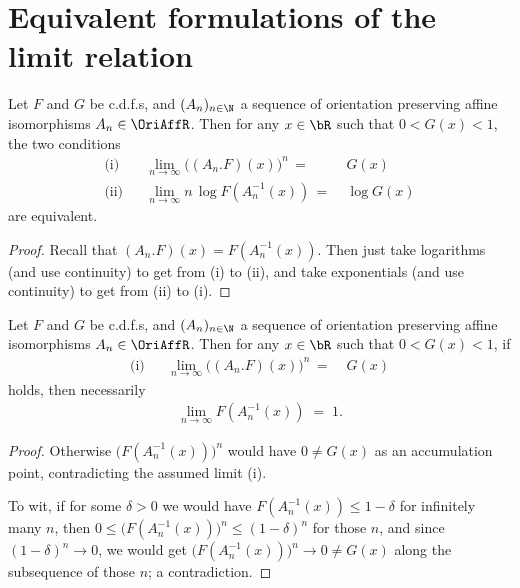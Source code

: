 \section{Equivalent formulations of the limit relation}

\begin{lemma}
  \label{lem:log-ev-limit}
  \leanok
  Let $F$ and $G$ be c.d.f.s, and $(A_n)_{n \in \N}$ a sequence of orientation
  preserving affine isomorphisms $A_n \in \OriAffR$. Then for any $x \in \bR$
  such that $0 < G(x) < 1$, the two conditions
  \begin{align*}
  \text{(i)} & & \lim_{n \to \infty} \big( (A_n.F)(x) \big)^n \, = \; & G(x) \\
  \text{(ii)} & & \lim_{n \to \infty} n \, \log F (A_n^{-1}(x)) \, = \; & \log G(x)
  \end{align*}
  are equivalent.
\end{lemma}
\begin{proof}
  \uses{}
  \leanok
  Recall that $(A_n.F)(x) = F (A_n^{-1}(x))$.
  Then just take logarithms (and use continuity) to get from (i) to (ii),
  and take exponentials (and use continuity) to get from (ii) to (i).
\end{proof}

\begin{lemma}
  \label{lem:ev-limit-cdf-affine-tendsto-one}
  \leanok
  Let $F$ and $G$ be c.d.f.s, and $(A_n)_{n \in \N}$ a sequence of orientation
  preserving affine isomorphisms $A_n \in \OriAffR$. Then for any $x \in \bR$
  such that $0 < G(x) < 1$, if
  \begin{align*}
  \text{(i)} & & \lim_{n \to \infty} \big( (A_n.F)(x) \big)^n \, = \; & G(x)
  \end{align*}
  holds, then necessarily
  \begin{align*}
    \lim_{n \to \infty} F (A_n^{-1}(x)) \; = \; 1 .
  \end{align*}
\end{lemma}
\begin{proof}
  Otherwise $\big( F (A_n^{-1}(x)) \big)^n$ would have $0 \ne G(x)$
  as an accumulation point, contradicting the assumed limit (i).

  To wit, if for some $\delta > 0$ we would have
  $F (A_n^{-1}(x)) \le 1 - \delta$ for infinitely many $n$, then
  $0 \le \big( F (A_n^{-1}(x)) \big)^n \le (1 - \delta)^n $
  for those $n$, and since $(1 - \delta)^n \to 0$, we would
  get $\big( F (A_n^{-1}(x)) \big)^n \to 0 \ne G(x)$ along the
  subsequence of those $n$; a contradiction.
\end{proof}

